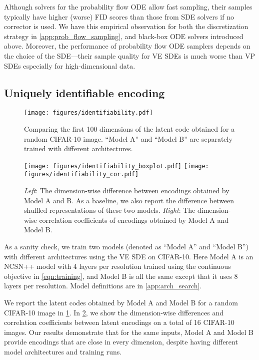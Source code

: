 \documentclass{article} \usepackage{iclr2021_conference,times}
\begin{document}
Although solvers for the probability flow ODE allow fast sampling, their samples typically have higher (worse) FID scores than those from SDE solvers if no corrector is used. We have this empirical observation for both the discretization strategy in \cref{app:prob_flow_sampling}, and black-box ODE solvers introduced above. Moreover, the performance of probability flow ODE samplers depends on the choice of the SDE---their sample quality for VE SDEs is much worse than VP SDEs especially for high-dimensional data.

\subsection{Uniquely identifiable encoding}\label{app:identifiability}

\begin{figure}
    \centering
    \texttt{[image: figures/identifiability.pdf]}
    \caption{Comparing the first 100 dimensions of the latent code obtained for a random CIFAR-10 image. ``Model A'' and ``Model B'' are separately trained with different architectures.}
    \label{fig:identifiability}
\end{figure}

\begin{figure}
    \centering
    \texttt{[image: figures/identifiability\_boxplot.pdf]}
    \texttt{[image: figures/identifiability\_cor.pdf]}
    \caption{\emph{Left}: The dimension-wise difference between encodings obtained by Model A and B. As a baseline, we also report the difference between shuffled representations of these two models.
    \emph{Right}: The dimension-wise correlation coefficients of encodings obtained by Model A and Model B.}
    \label{fig:identifiability_boxplot}
\end{figure}

As a sanity check, we train two models (denoted as ``Model A'' and ``Model B'') with different architectures using the VE SDE on CIFAR-10. Here Model A is an NCSN++ model with 4 layers per resolution trained using the continuous objective in \cref{eqn:training}, and Model B is all the same except that it uses 8 layers per resolution. Model definitions are in \cref{app:arch_search}. 

We report the latent codes obtained by Model A and Model B for a random CIFAR-10 image in \cref{fig:identifiability}. In \cref{fig:identifiability_boxplot}, we show the dimension-wise differences and correlation coefficients between latent encodings on a total of 16 CIFAR-10 images. Our results demonstrate that for the same inputs, Model A and Model B provide encodings that are close in every dimension, despite having different model architectures and training runs.
\end{document}
